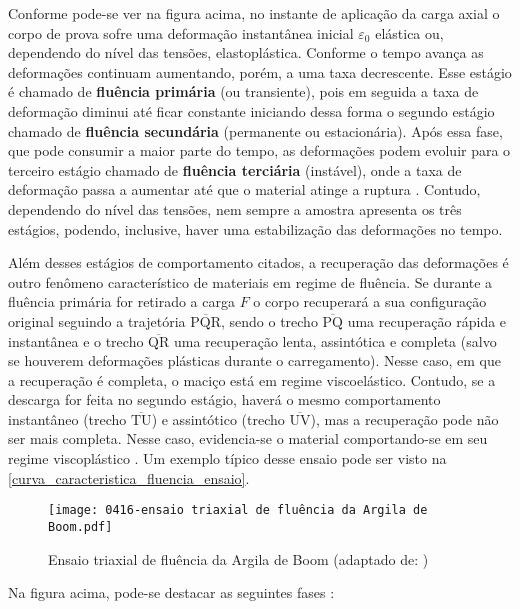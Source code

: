 Conforme pode-se ver na figura acima, no instante de aplicação da carga axial o corpo de prova sofre uma deformação instantânea inicial $\varepsilon_0$ elástica ou, dependendo do nível das tensões, elastoplástica. Conforme o tempo avança as deformações continuam aumentando, porém, a uma taxa decrescente. Esse estágio é chamado de \textbf{fluência primária} (ou transiente), pois em seguida a taxa de deformação diminui até ficar constante iniciando dessa forma o segundo estágio chamado de \textbf{fluência secundária} (permanente ou estacionária). Após essa fase, que pode consumir a maior parte do tempo, as deformações podem evoluir para o terceiro estágio chamado de \textbf{fluência terciária} (instável), onde a taxa de deformação passa a aumentar até que o material atinge a ruptura \cite{Costa1984}. Contudo, dependendo do nível das tensões, nem sempre a amostra apresenta os três estágios, podendo, inclusive, haver uma estabilização das deformações no tempo.

Além desses estágios de comportamento citados, a recuperação das deformações é outro fenômeno característico de materiais em regime de fluência. Se durante a fluência primária for retirado a carga $F$ o corpo recuperará a sua configuração original seguindo a trajetória $\overline{\textrm{PQR}}$, sendo o trecho $\overline{\textrm{PQ}}$ uma recuperação rápida e instantânea e o trecho $\overline{\textrm{QR}}$ uma recuperação lenta, assintótica e completa (salvo se houverem deformações plásticas durante o carregamento). Nesse caso, em que a recuperação é completa, o maciço está em regime viscoelástico. Contudo, se a descarga for feita no segundo estágio, haverá o mesmo comportamento instantâneo (trecho $\overline{\textrm{TU}}$) e assintótico (trecho $\overline{\textrm{UV}}$), mas a recuperação pode não ser mais completa. Nesse caso, evidencia-se o material comportando-se em seu regime viscoplástico \cite{Costa1984}. Um exemplo típico desse ensaio pode ser visto na \autoref{curva_caracteristica_fluencia_ensaio}.

\begin{figure}[H]
	\begin{center}
		\texttt{[image: 0416-ensaio triaxial de fluência da Argila de Boom.pdf]}
	\end{center}
	\caption{\label{curva_caracteristica_fluencia_ensaio}Ensaio triaxial de fluência da Argila de Boom (adaptado de: )}
\end{figure}

Na figura acima, pode-se destacar as seguintes fases \cite[p. 42]{Rousset1988}:

